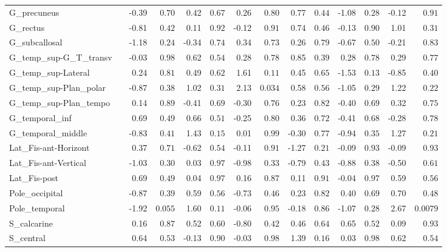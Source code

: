 {\begin{longtable}{llrrrrrrrrrrrr}
G\_precuneus &  & -0.39 & $0.70$ & 0.42 & $0.67$ & 0.26 & $0.80$ & 0.77 & $0.44$ & -1.08 & $0.28$ & -0.12 & $0.91$ \\
G\_rectus &  & -0.81 & $0.42$ & 0.11 & $0.92$ & -0.12 & $0.91$ & 0.74 & $0.46$ & -0.13 & $0.90$ & 1.01 & $0.31$ \\
G\_subcallosal &  & -1.18 & $0.24$ & -0.34 & $0.74$ & 0.34 & $0.73$ & 0.26 & $0.79$ & -0.67 & $0.50$ & -0.21 & $0.83$ \\
G\_temp\_sup-G\_T\_transv &  & -0.03 & $0.98$ & 0.62 & $0.54$ & 0.28 & $0.78$ & 0.85 & $0.39$ & 0.28 & $0.78$ & 0.29 & $0.77$ \\
G\_temp\_sup-Lateral &  & 0.24 & $0.81$ & 0.49 & $0.62$ & 1.61 & $0.11$ & 0.45 & $0.65$ & -1.53 & $0.13$ & -0.85 & $0.40$ \\
G\_temp\_sup-Plan\_polar &  & -0.87 & $0.38$ & 1.02 & $0.31$ & 2.13 & $0.034$ & 0.58 & $0.56$ & -1.05 & $0.29$ & 1.22 & $0.22$ \\
G\_temp\_sup-Plan\_tempo &  & 0.14 & $0.89$ & -0.41 & $0.69$ & -0.30 & $0.76$ & 0.23 & $0.82$ & -0.40 & $0.69$ & 0.32 & $0.75$ \\
G\_temporal\_inf &  & 0.69 & $0.49$ & 0.66 & $0.51$ & -0.25 & $0.80$ & 0.36 & $0.72$ & -0.41 & $0.68$ & -0.28 & $0.78$ \\
G\_temporal\_middle &  & -0.83 & $0.41$ & 1.43 & $0.15$ & 0.01 & $0.99$ & -0.30 & $0.77$ & -0.94 & $0.35$ & 1.27 & $0.21$ \\
Lat\_Fis-ant-Horizont &  & 0.37 & $0.71$ & -0.62 & $0.54$ & -0.11 & $0.91$ & -1.27 & $0.21$ & -0.09 & $0.93$ & -0.09 & $0.93$ \\
Lat\_Fis-ant-Vertical &  & -1.03 & $0.30$ & 0.03 & $0.97$ & -0.98 & $0.33$ & -0.79 & $0.43$ & -0.88 & $0.38$ & -0.50 & $0.61$ \\
Lat\_Fis-post &  & 0.69 & $0.49$ & 0.04 & $0.97$ & 0.16 & $0.87$ & 0.11 & $0.91$ & -0.04 & $0.97$ & 0.59 & $0.56$ \\
Pole\_occipital &  & -0.87 & $0.39$ & 0.59 & $0.56$ & -0.73 & $0.46$ & 0.23 & $0.82$ & 0.40 & $0.69$ & 0.70 & $0.48$ \\
Pole\_temporal &  & -1.92 & $0.055$ & 1.60 & $0.11$ & -0.06 & $0.95$ & -0.18 & $0.86$ & -1.07 & $0.28$ & 2.67 & $0.0079$ \\
S\_calcarine &  & 0.16 & $0.87$ & 0.52 & $0.60$ & -0.80 & $0.42$ & 0.46 & $0.64$ & 0.65 & $0.52$ & 0.09 & $0.93$ \\
S\_central &  & 0.64 & $0.53$ & -0.13 & $0.90$ & -0.03 & $0.98$ & 1.39 & $0.16$ & 0.03 & $0.98$ & 0.62 & $0.54$ \\

\end{longtable}}
